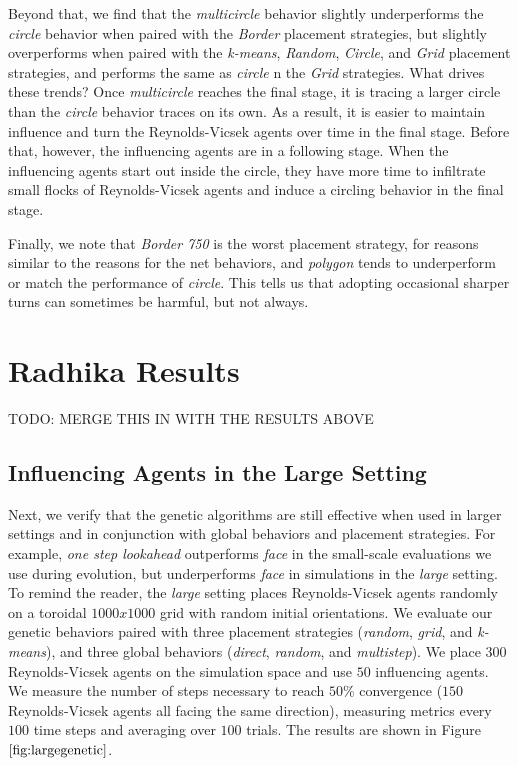 Beyond that, we find that the \textit{multicircle} behavior slightly
underperforms the \textit{circle} behavior when paired with the
\textit{Border} placement strategies, but slightly overperforms when paired
with the  \textit{k-means}, \textit{Random}, \textit{Circle}, and
\textit{Grid} placement strategies, and performs the same as \textit{circle}
n the \textit{Grid} strategies.
What drives these trends?
Once \textit{multicircle} reaches the final stage, it is tracing a larger
circle than the \textit{circle} behavior traces on its own.
As a result, it is easier to maintain influence and turn the Reynolds-Vicsek agents
over time in the final stage.
Before that, however, the influencing agents are in a following stage.
When the influencing agents start out inside the circle, they have more time to
infiltrate small flocks of Reynolds-Vicsek agents and induce a circling behavior in
the final stage.

Finally, we note that \textit{Border 750} is the worst placement strategy,
for reasons similar to the reasons for the net behaviors, and \textit{polygon}
tends to underperform or match the performance of \textit{circle}.
This tells us that adopting occasional sharper turns can sometimes be harmful,
but not always.

\section{Radhika Results}

TODO: MERGE THIS IN WITH THE RESULTS ABOVE

\subsection{Influencing Agents in the Large Setting}
Next, we verify that the genetic algorithms are still effective when used in
larger settings and in conjunction with global behaviors and placement
strategies.
For example, \textit{one step lookahead} outperforms \textit{face} in the
small-scale evaluations we use during evolution, but underperforms \textit{face}
in simulations in the \textit{large} setting.
To remind the reader, the \textit{large} setting places Reynolds-Vicsek agents
randomly on a toroidal $1000x1000$ grid with random initial orientations.
We evaluate our genetic behaviors paired with three placement strategies
(\textit{random}, \textit{grid}, and \textit{k-means}), and three global
behaviors (\textit{direct}, \textit{random}, and \textit{multistep}).
We place $300$ Reynolds-Vicsek agents on the simulation space and use $50$
influencing agents.
We measure the number of steps necessary to reach $50\%$ convergence ($150$
Reynolds-Vicsek agents all facing the same direction), measuring metrics every
$100$ time steps and averaging over $100$ trials.
The results are shown in Figure $\ref{fig:largegenetic}$.

